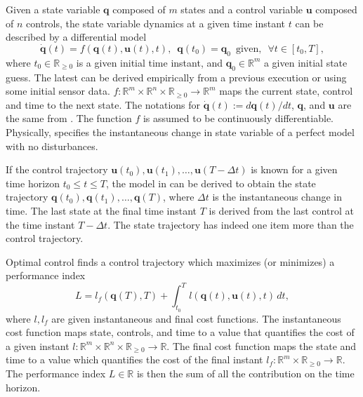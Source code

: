 Given a state variable $\mathbf{q}$ composed of $m$ states and a control variable $\mathbf{u}$ composed of $n$ controls, the state variable dynamics at a given time instant $t$ can be described by a differential model
\begin{equation}\label{eq:optimization:perfect-model}
    \dot{\mathbf{q}}(t)=f(\mathbf{q}(t),\mathbf{u}(t),t),\,\,\,\mathbf{q}(t_0)=\mathbf{q}_0\,\,\,\text{given},\,\,\,\forall t\in[t_0,T],
\end{equation}
where $t_0\in\mathbb{R}_{\geq 0}$ is a given initial time instant, and $\mathbf{q}_0\in\mathbb{R}^m$ a given initial state guess. The latest can be derived empirically from a previous execution or using some initial sensor data. $f:\mathbb{R}^m\times\mathbb{R}^n\times\mathbb{R}_{\geq 0}\rightarrow\mathbb{R}^m$ maps the current state, control and time to the next state. The notations for $\dot{\mathbf{q}}(t):=d\mathbf{q}(t)/dt$, $\mathbf{q}$, and $\mathbf{u}$ are the same from . The function $f$ is assumed to be continuously differentiable. Physically,  specifies the instantaneous change in state variable of a perfect model with no disturbances.

If the control trajectory $\mathbf{u}(t_0),\mathbf{u}(t_1),\dots,\mathbf{u}(T-\Delta t)$ is known for a given time horizon $t_0\leq t\leq T$, the model in  can be derived to obtain the state trajectory $\mathbf{q}(t_0),\mathbf{q}(t_1),\dots,\mathbf{q}(T)$, where $\Delta t$ is the instantaneous change in time. The last state at the final time instant $T$ is derived from the last control at the time instant $T-\Delta t$. The state trajectory has indeed one item more than the control trajectory.

Optimal control finds a control trajectory which maximizes (or minimizes) a performance index
\begin{equation}
    L=l_f(\mathbf{q}(T),T)+\int_{t_0}^T{l(\mathbf{q}(t),\mathbf{u}(t),t)\,dt},
\end{equation}
where $l,l_f$ are given instantaneous and final cost functions. The instantaneous cost function maps state, controls, and time to a value that quantifies the cost of a given instant $l:\mathbb{R}^m\times\mathbb{R}^n\times\mathbb{R}_{\geq 0}\rightarrow\mathbb{R}$. The final cost function maps the state and time to a value which quantifies the cost of the final instant $l_f:\mathbb{R}^m\times\mathbb{R}_{\geq 0}\rightarrow\mathbb{R}$. The performance index $L\in\mathbb{R}$ is then the sum of all the contribution on the time horizon.

